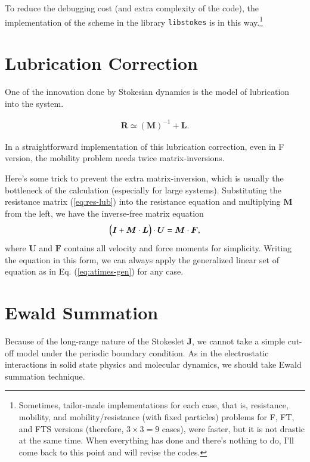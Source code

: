 \documentclass{book}
\begin{document}
To reduce the debugging cost (and extra complexity of the code),
the implementation of the scheme in the library {\tt libstokes}
is in this way.\footnote{
  Sometimes, tailor-made implementations for each case,
  that is, resistance, mobility, and mobility/resistance
  (with fixed particles) problems for F, FT, and FTS versions
  (therefore, $3\times 3 = 9$ cases), were faster,
  but it is not drastic at the same time.
  When everything has done and there's nothing to do,
  I'll come back to this point and will revise the codes.}




\section{Lubrication Correction}
One of the innovation done by Stokesian dynamics
\cite{BradyBossis1988,DurlofskyEtal1987,BradyEtal1988}
is the model of lubrication into the system.

\begin{eqnarray}
  \bm{R}
  \simeq
  \left(
    \bm{M}
  \right)^{-1}
  +
  \bm{L}
  .
  \label{eq:res-lub}
\end{eqnarray}

In a straightforward implementation of this lubrication correction,
even in F version, the mobility problem needs twice matrix-inversions.

Here's some trick to prevent the extra matrix-inversion,
which is usually the bottleneck of the calculation
(especially for large systems).
Substituting the resistance matrix (\ref{eq:res-lub})
into the resistance equation and multiplying $\bm{M}$ from the left,
we have the inverse-free matrix equation
\begin{equation}
  \Bigl(
    \bm{I}
    +
    \bm{M}
    \cdot
    \bm{L}
  \Bigr)
  \cdot
  \bm{U}
  =
  \bm{M}
  \cdot
  \bm{F}
  ,
\end{equation}
where $\bm{U}$ and $\bm{F}$ contains all velocity and force moments
for simplicity.
Writing the equation in this form,
we can always apply the generalized linear set of equation
as in Eq. (\ref{eq:atimes-gen}) for any case.


\section{Ewald Summation}
Because of the long-range nature of the Stokeslet $\bm{J}$,
we cannot take a simple cut-off model under the periodic
boundary condition. As in the electrostatic interactions
in solid state physics and molecular dynamics, we should
take Ewald summation technique.
\end{document}
